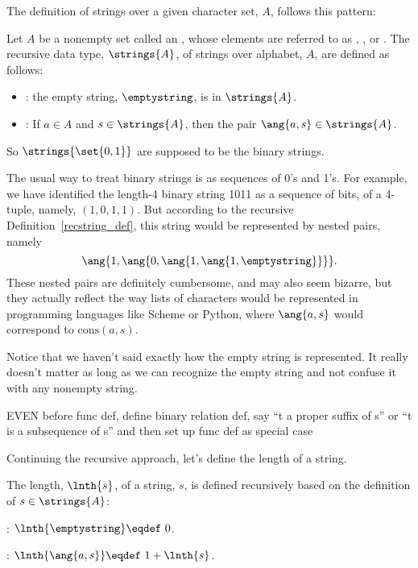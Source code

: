 The definition of strings over a given character set, $A$, follows this
pattern:

\begin{definition}\label{recstring_def}
  Let $A$ be a nonempty set called an , whose elements are
  referred to as , , or .
  The recursive data type, $\strings{A}$, of strings over alphabet, $A$,
  are defined as follows:
\begin{itemize}
\item {}: the empty string, $\emptystring$, is in $\strings{A}$.

\item {}: If $a \in A$ and $s \in \strings{A}$, then the pair
       $\ang{a,s} \in \strings{A}$.
\end{itemize}
\end{definition}
So $\strings{\set{0,1}}$ are supposed to be the binary strings.

The usual way to treat binary strings is as sequences of 0's and 1's.
For example, we have identified the length-4 binary string 1011 as a
sequence of bits, of a 4-tuple, namely, $(1,0,1,1)$.  But according to
the recursive Definition~\ref{recstring_def}, this string would be
represented by nested pairs, namely
\[
\ang{1,\ang{0,\ang{1,\ang{1,\emptystring}}}}.
\]
These nested pairs are definitely cumbersome, and may also seem
bizarre, but they actually reflect the way lists of characters would
be represented in programming languages like Scheme or Python, where
$\ang{a,s}$ would correspond to $\text{cons}(a, s)$.

Notice that we haven't said exactly how the empty string is
represented.  It really doesn't matter as long as we can recognize the
empty string and not confuse it with any nonempty string.

\begin{editingnotes}
EVEN before func def, define binary relation def, say ``t a proper suffix of s'' or
``t is a subsequence of s'' and then set up func def as special case
\end{editingnotes}

Continuing the recursive approach, let's define the length of a string.
\begin{definition}
The length, $\lnth{s}$, of a string, $s$, is defined recursively
based on the definition of $s \in \strings{A}$:

\item {}:  $\lnth{\emptystring} \eqdef\ 0$.

\item {}: $\lnth{\ang{a,s}} \eqdef\ 1 + \lnth{s}$.

\end{definition}


